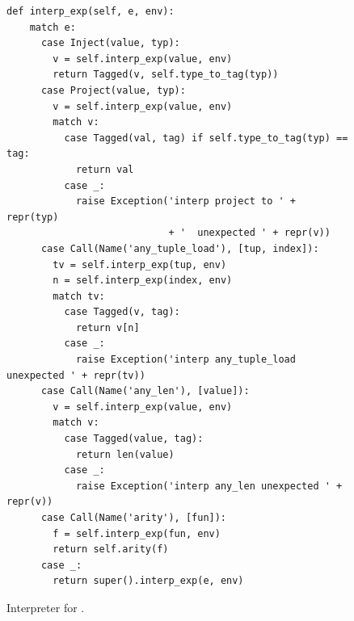 \documentclass[7x10]{TimesAPriori_MIT}%
\numberwithin{theorem}{chapter}
\numberwithin{definition}{chapter}
\numberwithin{equation}{chapter}
\begin{document}
\begin{figure}[btp]
\begin{tcolorbox}[colback=white]
{\begin{lstlisting}[basicstyle=\ttfamily\footnotesize]
  def interp_exp(self, e, env):
    match e:
      case Inject(value, typ):
        v = self.interp_exp(value, env)
        return Tagged(v, self.type_to_tag(typ))
      case Project(value, typ):
        v = self.interp_exp(value, env)
        match v:
          case Tagged(val, tag) if self.type_to_tag(typ) == tag:
            return val
          case _:
            raise Exception('interp project to ' + repr(typ)
                            + '  unexpected ' + repr(v))
      case Call(Name('any_tuple_load'), [tup, index]):
        tv = self.interp_exp(tup, env)
        n = self.interp_exp(index, env)
        match tv:
          case Tagged(v, tag):
            return v[n]
          case _:
            raise Exception('interp any_tuple_load unexpected ' + repr(tv))
      case Call(Name('any_len'), [value]):
        v = self.interp_exp(value, env)
        match v:
          case Tagged(value, tag):
            return len(value)
          case _:
            raise Exception('interp any_len unexpected ' + repr(v))
      case Call(Name('arity'), [fun]):
        f = self.interp_exp(fun, env)
        return self.arity(f)
      case _:
        return super().interp_exp(e, env)
\end{lstlisting}
\fi}
  \end{tcolorbox}
\caption{Interpreter for \LangAny{}.}
\label{fig:interp-Lany}
\end{figure}
\end{document}
